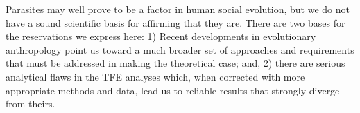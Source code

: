 \documentclass[12pt]{article}
\begin{document}
	Parasites may well prove to be a factor in human social evolution, but we do not have a sound scientific basis for affirming that they are.  There are two bases for the reservations we express here:  1) Recent developments in evolutionary anthropology \citep{smith2001tree, laland2011sense} point us toward a much broader set of approaches and requirements that must be addressed in making the theoretical case; and, 2) there are serious analytical flaws in the TFE analyses which, when corrected with more appropriate methods and data, lead us  \citep[and][]{hackman2013fast} to  reliable results that strongly diverge from theirs.






\end{document}
